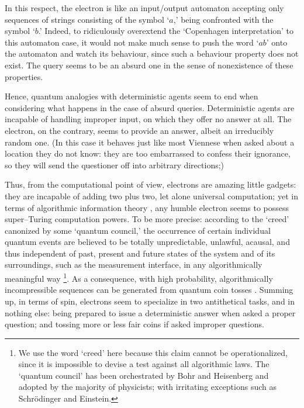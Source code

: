 \documentclass{article}
\begin{document}
In this respect, the electron is like an input/output automaton
accepting only  sequences of strings consisting of the symbol
`$a$,' being confronted with the symbol `$b$.'
Indeed, to ridiculously overextend the `Copenhagen interpretation'
 to this automaton case, it would not make much sense
to push the word `$ab$' onto the automaton and watch its behaviour,
since such a behaviour property does not exist.
The query seems to be an absurd one in the sense of nonexistence of these properties.

Hence, quantum analogies with deterministic agents seem
to end when considering what happens in the case of absurd queries.
Deterministic agents are incapable of handling improper input,
on which they offer no answer at all.
The electron, on the contrary, seems to provide an answer,
albeit an irreducibly random one.
(In this case it behaves just like most Viennese when asked
about a location they do not know: they are too embarrassed to
confess their ignorance, so they will send
the questioner off into arbitrary directions;)

Thus, from the computational point of view, electrons are amazing little gadgets:
they are incapable of adding two plus two, let alone  universal computation;
yet in terms of algorithmic information theory \cite{chaitin:01,calude:02},
any humble electron seems to possess super--Turing computation powers.
To be more precise:  according to the
`creed'
canonized by some
`quantum council,'
the occurrence of certain individual quantum events are believed to be
totally unpredictable, unlawful, acausal,  and thus independent of past,
present and future states of the
system and of its surroundings, such as the measurement interface, in any algorithmically meaningful way
\footnote{We use the word `creed' here because this claim
cannot be operationalized, since it is impossible to devise a test
against all algorithmic laws.
The `quantum council' has been orchestrated by Bohr and  Heisenberg and adopted by
the majority of physicists; with irritating exceptions such as Schr\"odinger and Einstein.}.
As a consequence, with high probability,
algorithmically incompressible sequences can be generated from quantum coin tosses
\cite{svozil-qct,zeilinger:qct}.
Summing up, in terms of spin, electrons seem to specialize in two antithetical tasks,
and in nothing else:
being prepared to issue a deterministic answer when asked a proper question; and
tossing more or less fair coins if asked improper questions.
\end{document}
